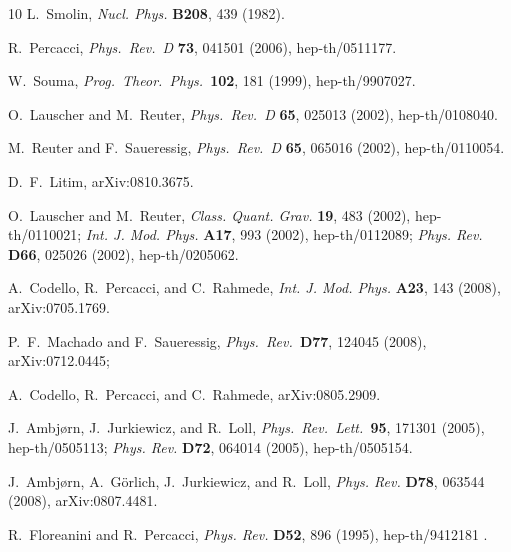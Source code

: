 \documentclass[11pt,reqno]{article}
\newcommand{\2}{\sqrt{2\,}}
\begin{document}
\begin{thebibliography}{10}
L.~Smolin,
{\it Nucl. Phys. }{\bf B208}, 439 (1982).

 R.~Percacci, {\it Phys.\ Rev.\ D }{\bf 73}, 041501 (2006), hep-th/0511177.

W.~Souma,
{\it  Prog.\ Theor.\ Phys.\  }{\bf 102}, 181 (1999), 
  hep-th/9907027.
  
O.~Lauscher and M.~Reuter,
{\it  Phys.\ Rev.\  D }{\bf 65}, 025013 (2002),
  hep-th/0108040.
  
M.~Reuter and F.~Saueressig,
{\it  Phys.\ Rev.\  D }{\bf 65}, 065016 (2002), hep-th/0110054.

D.~F.~Litim,
arXiv:0810.3675.



O.~Lauscher and M.~Reuter,
{\it Class. Quant. Grav. }{\bf 19}, 483 (2002), hep-th/0110021;
{\it Int. J. Mod. Phys. }{\bf A17}, 993 (2002), hep-th/0112089;
{\it Phys. Rev. }{\bf D66}, 025026 (2002), hep-th/0205062.


A.~Codello, R.~Percacci, and C.~Rahmede,
{\it Int. J. Mod. Phys. }{\bf A23}, 143 (2008), arXiv:0705.1769.

P.~F.~Machado and F.~Saueressig,
{\it Phys.\ Rev.\   }{\bf D77}, 124045 (2008),
arXiv:0712.0445;

A.~Codello, R.~Percacci, and C.~Rahmede,
arXiv:0805.2909.

J.~Ambj{\o}rn, J.~Jurkiewicz, and R.~Loll,
{\it Phys.\ Rev.\ Lett.\ }{\bf 95}, 171301 (2005), hep-th/0505113;
%
{\it Phys. Rev. }{\bf D72}, 064014 (2005), hep-th/0505154.

J.~Ambj{\o}rn, A.~G{\"o}rlich, J.~Jurkiewicz, and R.~Loll,
{\it Phys. Rev. }{\bf D78}, 063544 (2008), arXiv:0807.4481.

R.~Floreanini and R.~Percacci,
{\it Phys. Rev. }{\bf D52}, 896 (1995), hep-th/9412181 .


\end{thebibliography}
\end{document}
